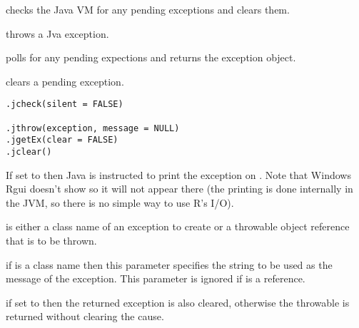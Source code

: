 \begin{Description}\relax
{} checks the Java VM for any pending exceptions and
clears them.

 throws a Jva exception.

 polls for any pending expections and returns the exception object.

 clears a pending exception.
\end{Description}
\begin{Usage}
\begin{verbatim}
.jcheck(silent = FALSE)

.jthrow(exception, message = NULL)
.jgetEx(clear = FALSE)
.jclear()
\end{verbatim}
\end{Usage}
\begin{Arguments}
\begin{ldescription}
\item[\code{silent}] If set to  then Java is instructed to print
the exception on . Note that Windows Rgui doesn't show
 so it will not appear there (the printing is done
internally in the JVM, so there is no simple way to use R's I/O).
\item[\code{exception}] is either a class name of an exception to create or a
throwable object reference that is to be thrown.
\item[\code{message}] if  is a class name then this parameter
specifies the string to be used as the message of the exception. This
parameter is ignored if  is a reference.
\item[\code{clear}] if set to  then the returned exception is also
cleared, otherwise the throwable is returned without clearing the
cause.
\end{ldescription}
\end{Arguments}
